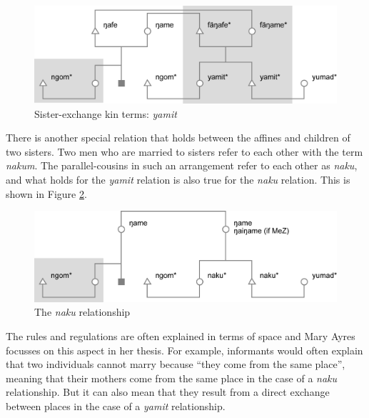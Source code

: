 \begin{figure}
	\includegraphics[width=12cm]{figures/kinship4.png}
	\caption[Sister-exchange kin terms: \emph{yamit}]{Sister-exchange kin terms: \emph{yamit}}
	\label{fig:kinship4}
\end{figure}%

There is another special relation that holds between the affines and children of two sisters. Two men who are married to sisters refer to each other with the term \emph{nakum}. The parallel-cousins in such an arrangement refer to each other as \emph{naku}, and what holds for the \emph{yamit} relation is also true for the \emph{naku} relation. This is shown in Figure \ref{fig:kinship5}.

\begin{figure}
	\includegraphics[width=12cm]{figures/kinship5.png}
	\caption[The \emph{naku} relationship]{The \emph{naku} relationship}
	\label{fig:kinship5}
\end{figure}%

The rules and regulations are often explained in terms of space and Mary Ayres focusses on this aspect in her thesis. For example, informants would often explain that two individuals cannot marry because ``they come from the same place'', meaning that their mothers come from the same place in the case of a \emph{naku} relationship. But it can also mean that they result from a direct exchange between places in the case of a \emph{yamit} relationship.

